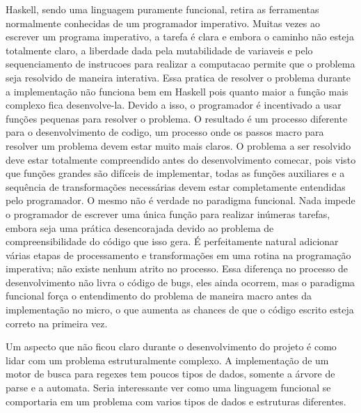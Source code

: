 Haskell, sendo uma linguagem puramente funcional, retira as ferramentas normalmente conhecidas de um programador imperativo.
Muitas vezes ao escrever um programa imperativo, a tarefa é clara e embora o caminho não esteja totalmente claro, a liberdade dada pela mutabilidade de variaveis e pelo sequenciamento de instrucoes para realizar a computacao permite que o problema seja resolvido de maneira interativa.
Essa pratica de resolver o problema durante a implementação não funciona bem em Haskell pois quanto maior a função mais complexo fica desenvolve-la.
Devido a isso, o programador é incentivado a usar funções pequenas para resolver o problema.
O resultado é um processo diferente para o desenvolvimento de codigo, um processo onde os passos macro para resolver um problema devem estar muito mais claros.
O problema a ser resolvido deve estar totalmente compreendido antes do desenvolvimento comecar, pois visto que funções grandes são difíceis de implementar, todas as funções auxiliares e a sequência de transformações necessárias devem estar completamente entendidas pelo programador.
O mesmo não é verdade no paradigma funcional.
Nada impede o programador de escrever uma única função para realizar inúmeras tarefas, embora seja uma prática desencorajada devido ao problema de compreensibilidade do código que isso gera.
É perfeitamente natural adicionar várias etapas de processamento e transformações em uma rotina na programação imperativa; não existe nenhum atrito no processo.
Essa diferença no processo de desenvolvimento não livra o código de bugs, eles ainda ocorrem, mas o paradigma funcional força o entendimento do problema de maneira macro antes da implementação no micro, o que aumenta as chances de que o código escrito esteja correto na primeira vez.

Um aspecto que não ficou claro durante o desenvolvimento do projeto é como lidar com um problema estruturalmente complexo.
A implementação de um motor de busca para regexes tem poucos tipos de dados, somente a árvore de parse e a automata.
Seria interessante ver como uma linguagem funcional se comportaria em um problema com varios tipos de dados e estruturas diferentes.
